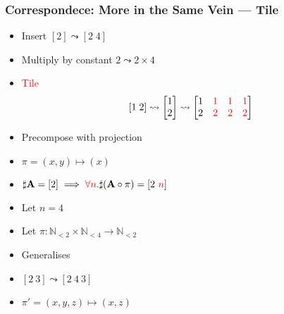 \documentclass[xetex,mathserif,serif]{beamer}
\newcommand\mrm[1]{\mathrm{#1}}
\newcommand\brm[1]{\bm{\mrm{#1}}}
\newcommand\Nat{\mathbb{N}}
\newcommand\NB[1]{\textcolor{red}{#1}}
\begin{document}
\begin{frame}
  \frametitle{Correspondece: More in the Same Vein --- Tile}
  \begin{itemize}%
    \item Insert \([2] \leadsto [2\;4]\)
    \item Multiply by constant \(2\leadsto 2\times 4\)
    \item \NB{Tile} \[
      [1\;2]\leadsto
      \begin{bmatrix} 1 \\ 2 \end{bmatrix}\leadsto
      \begin{bmatrix} 1 & \NB 1 & \NB 1 & \NB  1 \\ 2 & \NB 2 & \NB 2 & \NB 2 \end{bmatrix}
    \]
    \item Precompose with projection
    \item \(\pi = (x, y) \mapsto (x)\)
    \item \(\sharp \brm A = [2] \implies \NB{\forall n.} \sharp(\brm A \circ \pi) = [2\ \NB n]\)
    \item Let \(n = 4\)
    \item Let \(\pi : \Nat_{<2} \times \Nat_{<4} \to \Nat_{<2}\)
    \item Generalises
    \item \([2\ 3] \leadsto [2\ 4\ 3]\)
    \item \(\pi' = (x, y, z) \mapsto (x, z)\)
  \end{itemize}
\end{frame}
\end{document}
